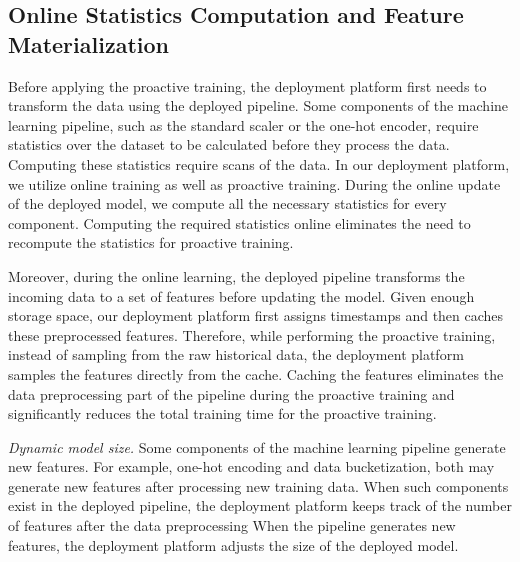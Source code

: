 \subsection{Online Statistics Computation and Feature Materialization}
Before applying the proactive training, the deployment platform first needs to transform the data using the deployed pipeline.
Some components of the machine learning pipeline, such as the standard scaler or the one-hot encoder, require statistics over the dataset to be calculated before they process the data.
Computing these statistics require scans of the data.
In our deployment platform, we utilize online training as well as proactive training.
During the online update of the deployed model, we compute all the necessary statistics for every component.
Computing the required statistics online eliminates the need to recompute the statistics for proactive training.

Moreover, during the online learning, the deployed pipeline transforms the incoming data to a set of features before updating the model.
Given enough storage space, our deployment platform first assigns timestamps and then caches these preprocessed features.
Therefore, while performing the proactive training, instead of sampling from the raw historical data, the deployment platform samples the features directly from the cache.
Caching the features eliminates the data preprocessing part of the pipeline during the proactive training and significantly reduces the total training time for the proactive training.

\textit{Dynamic model size.}
Some components of the machine learning pipeline generate new features.
For example, one-hot encoding and data bucketization, both may generate new features after processing new training data.
When such components exist in the deployed pipeline, the deployment platform keeps track of the number of features after the data preprocessing
When the pipeline generates new features, the deployment platform adjusts the size of the deployed model.


